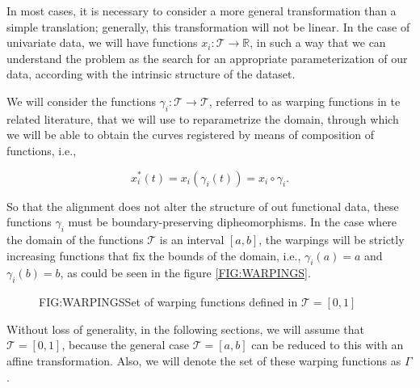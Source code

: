 In most cases, it is necessary to consider a more general transformation than a
simple translation; generally, this transformation will not be linear. In the
case of univariate data, we will have functions
$x_i: \mathcal{T} \rightarrow \mathbb{R}$, in such a way that we can understand
the problem as the search for an appropriate parameterization of our data,
according with the intrinsic structure of the dataset.

We will consider the functions $\gamma_i: \mathcal{T} \rightarrow \mathcal{T}$,
referred to as warping functions in te related literature, that we will use to reparametrize the domain, through which we will be able to
obtain the curves registered by means of composition of functions, i.e.,

$$
x_i^*(t)=x_i(\gamma_i(t)) = x_i \circ \gamma _i.
$$

So that the alignment does not alter the structure of out functional data,
these functions $\gamma_i$ must be boundary-preserving dipheomorphisms. In the
case where the domain of the functions $\mathcal{T}$ is an interval $[a,b]$, the
warpings will be strictly increasing functions that fix the bounds of the
domain, i.e., $\gamma_i(a)=a$ and $\gamma_i(b)=b$, as could be seen in the
figure \ref{FIG:WARPINGS}.

\begin{figure}[Set of warping functions]{FIG:WARPINGS}{Set of warping functions defined in $\mathcal{T}=[0,1]$}
\end{figure}


Without loss of generality, in the following sections, we
will assume that $\mathcal{T}=[0,1]$, because the general case
$\mathcal{T}=[a,b]$ can be reduced to this with an affine transformation. Also,
we will denote the set of these warping functions as $\Gamma$.
